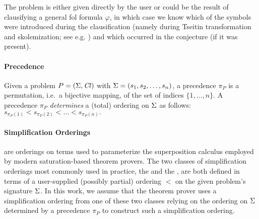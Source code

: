 \documentclass{ceurart}
\begin{document}
The problem is either given directly by the user or 
could be the result of clausifying a general \gls*{fol} formula \(\varphi\),
in which case we know which of the symbols were introduced during the clausification
(namely during Tseitin transformation and skolemization; see e.g. \citet{DBLP:books/el/RV01/NonnengartW01})
and which occurred in the conjecture (if it was present).

\paragraph{Precedence}
Given a problem \(P = (\operatorname{\Sigma}, \operatorname{\mathit{Cl}})\) with \(\operatorname{\Sigma} = (s_1, s_2, \ldots, s_n)\),
a precedence \(\pi_P\) is a permutation, i.e.~a bijective mapping, of the set of indices \(\{1,\ldots,n\}\).
A precedence \(\pi_P\) \emph{determines} a (total) ordering on \(\operatorname{\Sigma}\) as follows:
\(s_{\pi_P(1)} < s_{\pi_P(2)} < \ldots < s_{\pi_P(n)}.\)

\paragraph{Simplification Orderings} are orderings on terms used to parameterize the superposition calculus \cite{DBLP:books/el/RV01/NieuwenhuisR01}
employed by modern saturation-based theorem provers. The two classes of simplification orderings most commonly used in practice,
the  \cite{Knuth1983} and the  \cite{Kamin1980}, are both defined in terms 
of a user-supplied (possibly partial) ordering $<$ %
on the given problem's signature \(\operatorname{\Sigma}\).
In this work, we assume that the theorem prover uses a simplification ordering from one of these two classes
relying on the ordering on \(\operatorname{\Sigma}\) determined by a precedence \(\pi_P\) to construct such a simplification ordering.
\end{document}
